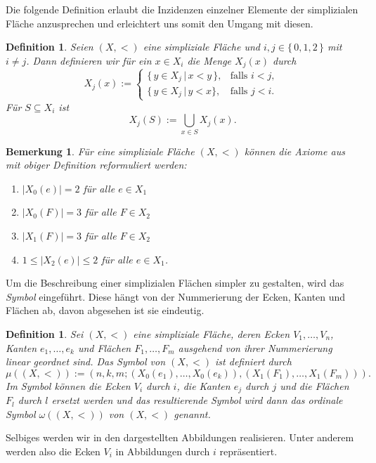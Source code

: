 \documentclass[12pt,titlepage,twoside,cleardoublepage]{article}
\theoremstyle{nummermitklammern}
\newtheorem{definition}[temp]{Definition}
\newtheorem{bemerkung}[temp]{Bemerkung}
\newtheorem{definition}[zahl]{Definition}
\newtheorem{bemerkung}[zahl]{Bemerkung}
\numberwithin{equation}{section}
\begin{document}
Die folgende Definition erlaubt die Inzidenzen einzelner Elemente der simplizialen Fläche anzusprechen und erleichtert uns somit den Umgang mit diesen.
\begin{definition} { \textsc{\cite{Rey}}}
Seien $(X,<)$ eine simpliziale Fläche und $i,j \in \{\,0,1,2\,\}$ mit $i \neq j$. Dann definieren wir für ein $x \in X_{i}$ die Menge $X_j(x)$ durch
\[
X_{j}(x):=
\begin{cases}
\{\,y \in X_{j}\,|\,x < y\,\}, &\text{falls $i < j$,  }\\
\{\,y \in X_{j}\,|\,y < x\}, &\text{falls $j<i$.}

\end{cases}
\]
Für $S \subseteq X_{i}$ ist 
\[
X_j(S):= \bigcup_{x\in S}X_{j}(x).
\]

\end{definition}
\begin{bemerkung}{ \textsc{\cite{Rey}}}
Für eine simpliziale Fläche $(X,<)$ können die Axiome aus  mit obiger Definition reformuliert werden:
\begin{enumerate}
\item $\vert X_{0}(e)\vert=2$ für alle $e \in X_{1}$
\item $\vert X_{0}(F)\vert=3$ für alle $F \in X_{2}$
\item $\vert X_{1}(F)\vert=3$ für alle $F \in X_{2}$
\item $1\leq  \vert X_{2}(e)\vert \leq 2$ für alle $e \in X_{1}$.
\end{enumerate}
\end{bemerkung}

Um die Beschreibung einer simplizialen Flächen simpler zu gestalten, wird  das \emph{Symbol} eingeführt. Diese hängt von der Nummerierung der Ecken, Kanten und Flächen ab, davon abgesehen ist sie eindeutig.
\begin{definition}{ \textsc{\cite{Rey}}}
 Sei $(X,<)$ eine simpliziale Fläche, deren Ecken $V_{1},\ldots,V_{n}$, Kanten $e_{1},\ldots,e_{k}$ und Flächen $F_{1},\ldots,F_{m}$ ausgehend von ihrer Nummerierung linear geordnet sind. Das \emph{Symbol} von $(X,<)$ ist definiert durch 
\[
\mu((X,<)):=(n,k,m;(X_{0}(e_{1}),\ldots,X_{0}(e_{k})),(X_{1}(F_{1}),\ldots,X_{1}(F_{m}))).
\]
Im Symbol können die Ecken $V_{i}$ durch $i$, die Kanten $e_{j}$ durch $j$ und die Flächen $F_{l}$ durch $l$ ersetzt werden und das resultierende Symbol wird dann das \emph{ordinale Symbol} $\omega((X,<))$ von $(X,<)$ genannt. \end{definition}
Selbiges werden wir in den dargestellten Abbildungen realisieren. Unter anderem werden also die Ecken $V_i$ in Abbildungen durch $i$ repräsentiert. 
\end{document}
